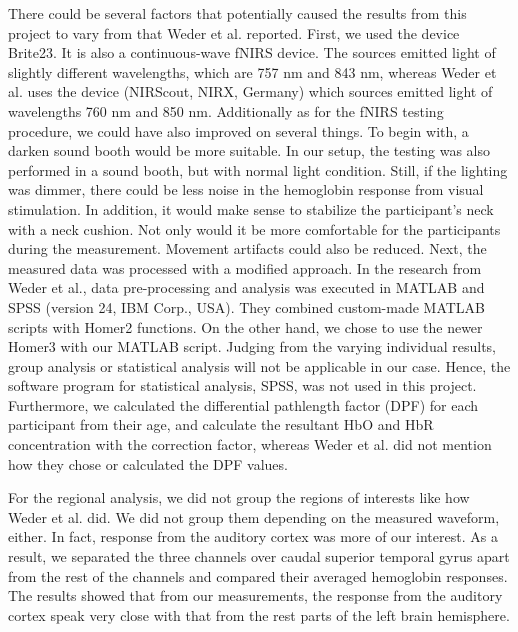 There could be several factors that potentially caused the results from this project to vary from that Weder et al. reported. First, we used the device Brite23. It is also a continuous-wave fNIRS device. The sources emitted light of slightly different wavelengths, which are 757 nm and 843 nm, whereas Weder et al. uses the device (NIRScout, NIRX, Germany) which sources emitted light of wavelengths 760 nm and 850 nm. Additionally as for the fNIRS testing procedure, we could have also improved on several things. To begin with, a darken sound booth would be more suitable. In our setup, the testing was also performed in a sound booth, but with normal light condition. Still, if the lighting was dimmer, there could be less noise in the hemoglobin response from visual stimulation. In addition, it would make sense to stabilize the participant's neck with a neck cushion. Not only would it be more comfortable for the participants during the measurement. Movement artifacts could also be reduced. Next, the measured data was processed with a modified approach. In the research from Weder et al., data pre-processing and analysis was executed in MATLAB and SPSS (version 24, IBM Corp., USA). They combined custom-made MATLAB scripts with Homer2 functions. On the other hand, we chose to use the newer Homer3 with our MATLAB script. Judging from the varying individual results, group analysis or statistical analysis will not be applicable in our case. Hence, the software program for statistical analysis, SPSS, was not used in this project. Furthermore, we calculated the differential pathlength factor (DPF) for each participant from their age, and calculate the resultant HbO and HbR concentration with the correction factor, whereas Weder et al. did not mention how they chose or calculated the DPF values.

For the regional analysis, we did not group the regions of interests like how Weder et al. did. We did not group them depending on the measured waveform, either. In fact, response from the auditory cortex was more of our interest. As a result, we separated the three channels over caudal superior temporal gyrus apart from the rest of the channels and compared their averaged hemoglobin responses. The results showed that from our measurements,  the response from the auditory cortex speak very close with that from the rest parts of the left brain hemisphere. 

